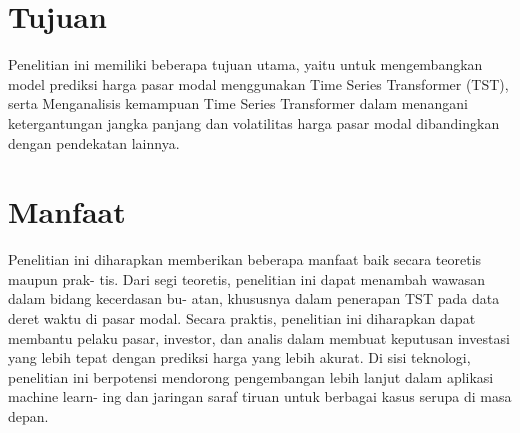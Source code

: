 \section{Tujuan}
 Penelitian ini memiliki beberapa tujuan utama, yaitu untuk mengembangkan model prediksi harga pasar modal menggunakan  Time Series Transformer (TST), serta Menganalisis kemampuan Time Series Transformer dalam menangani ketergantungan jangka panjang dan volatilitas harga pasar modal dibandingkan dengan pendekatan lainnya.

\section{Manfaat}
Penelitian ini diharapkan memberikan beberapa manfaat baik secara teoretis maupun prak-
tis. Dari segi teoretis, penelitian ini dapat menambah wawasan dalam bidang kecerdasan bu-
atan, khususnya dalam penerapan TST pada data deret waktu di pasar modal. Secara praktis,
penelitian ini diharapkan dapat membantu pelaku pasar, investor, dan analis dalam membuat
keputusan investasi yang lebih tepat dengan prediksi harga yang lebih akurat. Di sisi teknologi,
penelitian ini berpotensi mendorong pengembangan lebih lanjut dalam aplikasi machine learn-
ing dan jaringan saraf tiruan untuk berbagai kasus serupa di masa depan.

